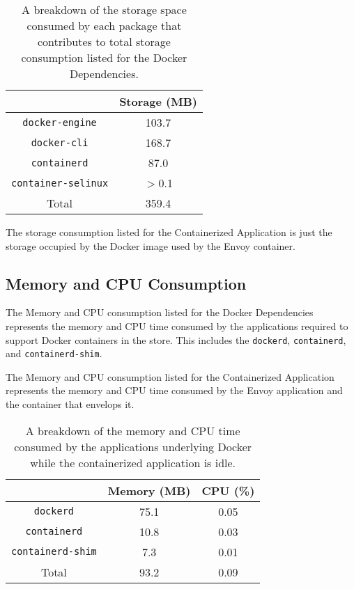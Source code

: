 \documentclass{article}
\begin{document}
\begin{table}[H]
\begin{tabular}{ |c|c| }
 \hline
   & Storage (MB) \\ 
 \hline
 \texttt{docker-engine} & 103.7 \\
 \hline
 \texttt{docker-cli} & 168.7 \\
 \hline
 \texttt{containerd} & 87.0 \\
 \hline
 \texttt{container-selinux} & $>$0.1 \\
 \hline\hline
 Total & 359.4 \\
 \hline
\end{tabular}
\caption{A breakdown of the storage space consumed by each package that contributes to total storage consumption listed for the Docker Dependencies.}
\label{table:3}
\end{table}

The storage consumption listed for the Containerized Application is just the storage occupied by the Docker image used by the Envoy container.

\subsection{Memory and CPU Consumption}
The Memory and CPU consumption listed for the Docker Dependencies represents the memory and CPU time consumed by the applications required to support Docker containers in the store. This includes the \texttt{dockerd}, \texttt{containerd}, and \texttt{containerd-shim}.

The Memory and CPU consumption listed for the Containerized Application represents the memory and CPU time consumed by the Envoy application and the container that envelops it.

\begin{table}[H]
\begin{tabular}{ |c|c|c| }
 \hline
   & Memory (MB) & CPU (\%) \\ 
 \hline
 \texttt{dockerd} & 75.1 & 0.05 \\
 \hline
 \texttt{containerd} & 10.8 & 0.03 \\
 \hline
 \texttt{containerd-shim} & 7.3 & 0.01 \\
 \hline\hline
 Total & 93.2 & 0.09 \\
 \hline
\end{tabular}
\caption{A breakdown of the memory and CPU time consumed by the applications underlying Docker while the containerized application is idle.}
\label{table:4}
\end{table}
\end{document}

